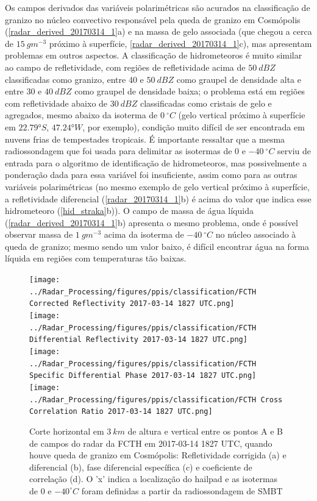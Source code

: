 Os campos derivados das variáveis polarimétricas são acurados na classificação de granizo no núcleo convectivo responsável pela queda de granizo em Cosmópolis (\autoref{radar_derived_20170314_1}a) e na massa de gelo associada (que chegou a cerca de $15\:gm^{-3}$ próximo à superfície, \autoref{radar_derived_20170314_1}c), mas apresentam problemas em outros aspectos. A classificação de hidrometeoros é muito similar ao campo de refletividade, com regiões de refletividade acima de $50\:dBZ$ classificadas como granizo, entre 40 e $50\:dBZ$ como graupel de densidade alta e entre 30 e $40\:dBZ$ como graupel de densidade baixa; o problema está em regiões com refletividade abaixo de $30\:dBZ$ classificadas como cristais de gelo e agregados, mesmo abaixo da isoterma de $0\:^{\circ}C$ (gelo vertical próximo à superfície em $\ang{22.79}S$, $\ang{47.24}W$, por exemplo), condição muito difícil de ser encontrada em nuvens frias de tempestades tropicais. É importante ressaltar que a mesma radiossondagem que foi usada para delimitar as isotermas de 0 e $-40\:^{\circ}C$ serviu de entrada para o algoritmo de identificação de hidrometeoros, mas possivelmente a ponderação dada para essa variável foi insuficiente, assim como para as outras variáveis polarimétricas (no mesmo exemplo de gelo vertical próximo à superfície, a refletividade diferencial (\autoref{radar_20170314_1}b) é acima do valor que indica esse hidrometeoro (\autoref{hid_straka}b)). O campo de massa de água líquida (\autoref{radar_derived_20170314_1}b) apresenta o mesmo problema, onde é possível observar massa de $1\:gm^{-3}$ acima da isoterma de $-40\:^{\circ}C$ no núcleo associado à queda de granizo; mesmo sendo um valor baixo, é difícil encontrar água na forma líquida em regiões com temperaturas tão baixas.

\begin{figure}[hp]
	\centering
	\caption{Corte horizontal em $3\:km$ de altura e vertical entre os pontos A e B de campos do radar da FCTH em 2017-03-14 1827 UTC, quando houve queda de granizo em Cosmópolis: Refletividade corrigida (a) e diferencial (b), fase diferencial específica (c) e coeficiente de correlação (d). O 'x' indica a localização do hailpad e as isotermas de $0$ e $-40^{\circ}C$ foram definidas a partir da radiossondagem de SMBT}
	\label{radar_20170314_1}
	\vspace{-5pt}
	\texttt{[image: ../Radar\_Processing/figures/ppis/classification/FCTH Corrected Reflectivity 2017-03-14 1827 UTC.png]} \\
	\vspace{-5pt}
	\texttt{[image: ../Radar\_Processing/figures/ppis/classification/FCTH Differential Reflectivity 2017-03-14 1827 UTC.png]} \\
	\vspace{-5pt}
	\texttt{[image: ../Radar\_Processing/figures/ppis/classification/FCTH Specific Differential Phase 2017-03-14 1827 UTC.png]} \\
	\vspace{-5pt}
	\texttt{[image: ../Radar\_Processing/figures/ppis/classification/FCTH Cross Correlation Ratio 2017-03-14 1827 UTC.png]} \\
\end{figure}

